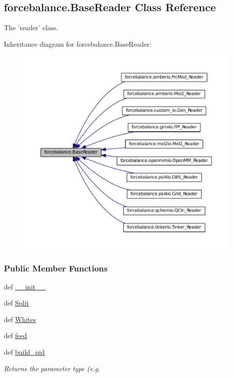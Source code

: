 \hypertarget{classforcebalance_1_1BaseReader}{\subsection{forcebalance.\-Base\-Reader \-Class \-Reference}
\label{classforcebalance_1_1BaseReader}
}


\-The 'reader' class.  




\-Inheritance diagram for forcebalance.\-Base\-Reader\-:\nopagebreak
\begin{figure}[H]
\begin{center}
\leavevmode
\includegraphics[width=350pt]{classforcebalance_1_1BaseReader__inherit__graph}
\end{center}
\end{figure}
\subsubsection*{\-Public \-Member \-Functions}
\begin{DoxyCompactItemize}
\item 
def \hyperlink{classforcebalance_1_1BaseReader_ae914de6033b9920eadb5632074e69d47}{\-\_\-\-\_\-init\-\_\-\-\_\-}
\item 
def \hyperlink{classforcebalance_1_1BaseReader_acded199bbc003eb93d071a972ef38901}{\-Split}
\item 
def \hyperlink{classforcebalance_1_1BaseReader_af2af8a559625614474a1c6fe245b5e13}{\-Whites}
\item 
def \hyperlink{classforcebalance_1_1BaseReader_a3c46942ef8cc25ece21d52be5b7ba05f}{feed}
\item 
def \hyperlink{classforcebalance_1_1BaseReader_aab2c64ccf0f803d4eff3bbf40a6cb0b7}{build\-\_\-pid}
\begin{DoxyCompactList}\small\item\em \-Returns the parameter type (e.\-g. \end{DoxyCompactList}\end{DoxyCompactItemize}
